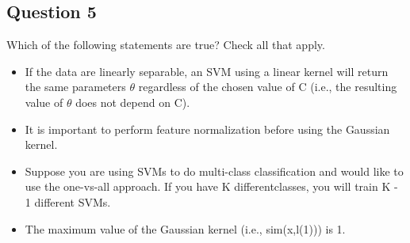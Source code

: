 \documentclass[11pt]{article} %
\begin{document}
\subsection*{Question 5} 
Which of the following statements are true? Check all that apply.

\begin{itemize}
	\item If the data are linearly separable, an SVM using a linear kernel will return the same parameters $\theta$ regardless of the chosen value of
	C (i.e., the resulting value of $\theta$ does not depend on C).
	
	\item It is important to perform feature normalization before using the Gaussian kernel.
	
	\item Suppose you are using SVMs to do multi-class classification and 	would like to use the one-vs-all approach. If you have K differentclasses, you will train K - 1 different SVMs.
	
	\item The maximum value of the Gaussian kernel (i.e., sim(x,l(1))) is 1.
\end{itemize}


\end{document}
